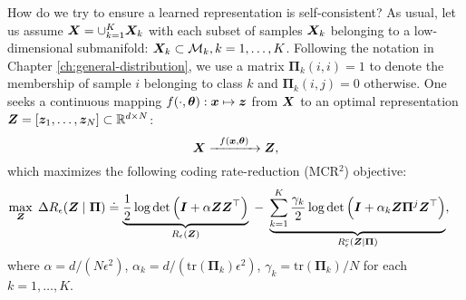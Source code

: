 \documentclass[../../book-main.tex]{subfiles}
\begin{document}
How do we try to ensure a learned representation is self-consistent? As usual, let us assume $\bm{X} = \cup_{k=1}^K \bm{X}_k$ with each subset of samples $\bm{X}_k$ belonging to a low-dimensional submanifold: $\bm{X}_k \subset \mathcal{M}_k, k = 1,\ldots, K$. Following the notation in Chapter \ref{ch:general-distribution}, we use a matrix $\bm \Pi_k(i,i) = 1$ to denote the membership of sample $i$ belonging to class $k$ and $\bm \Pi_k(i,j) = 0$ otherwise. One seeks a continuous mapping $f(\cdot,\bm \theta): \bm{x} \mapsto \bm{z}$ from $\bm{X}$ to an optimal representation $\bm{Z} = [\bm{z}_1, \ldots, \bm{z}_N] \subset \mathbb{R}^{d \times N}$:
\begin{equation}
\bm X  \xrightarrow{\hspace{2mm} f(\bm{x}, \bm \theta) \hspace{2mm}} \bm Z, 
\label{eqn:LDR}
\end{equation}
which maximizes the following coding rate-reduction (MCR$^2$) objective:
\begin{equation}\label{eq:mcr2-formulation}
\begin{split}
\max_{\Z} \; \Delta R_\epsilon(\Z  \mid \bm{\Pi}) %
&\doteq \underbrace{\frac{1}{2}\log\det \Big(\I + {\alpha} \Z \Z^\top \Big)}_{R_{\epsilon}(\Z)} \;-\; \underbrace{\sum_{k=1}^{K}\frac{\gamma_k}{2} \log\det\Big(\I + {\alpha_k} \Z \bm{\Pi}^{j} \Z^\top \Big)}_{R^c_{\epsilon}(\Z \mid \bm \Pi)},
\end{split}
\end{equation}
where $\alpha = {d}/({N\epsilon^2})$, $\alpha_k = d/({\mathrm{tr}(\bm{\Pi}_k)\epsilon^2})$, $\gamma_k =  {\mathrm{tr}(\bm{\Pi}_{k})}/{N}$ for each $k = 1,\dots, K$.
\end{document}
